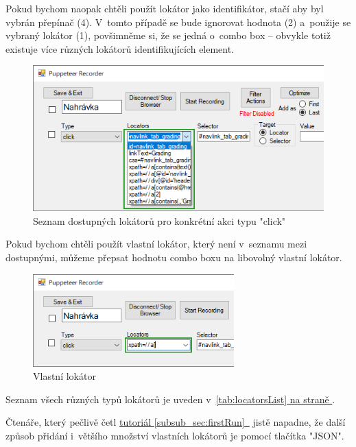 \documentclass[12pt, a4paper, twoside]{article}
\newcommand{\refFullAddedText}[3]{\hyperref[#1]{#2\ref{#1}~\nameref{#1}#3}}
\begin{document}
	Pokud bychom naopak chtěli použít lokátor jako identifikátor, stačí aby byl vybrán přepínač (4). V~tomto případě se bude ignorovat hodnota (2) a~použije se vybraný lokátor (1), povšimněme si, že se jedná o~combo box -- obvykle totiž existuje více různých lokátorů identifikujících element.
	\begin{figure}[H]
		\centering
		\includegraphics[width=1.0\textwidth]{allLocators.png}
		\caption{Seznam dostupných lokátorů pro konkrétní akci typu "click"}
	\end{figure}
	\newpage
	Pokud bychom chtěli použít vlastní lokátor, který není v~seznamu mezi dostupnými, můžeme přepsat hodnotu combo boxu na libovolný vlastní lokátor.
	\nopagebreak
	\begin{figure}[H]
		\centering
		\includegraphics[width=0.69\textwidth]{customLocator.png}
		\caption{Vlastní lokátor}
	\end{figure}
	Seznam všech různých typů lokátorů je uveden
v~\hyperref[tab:locatorsList]{\cref{tab:locatorsList} na straně \pageref{tab:locatorsList}}.
	
	Čtenáře, který pečlivě četl \refFullAddedText{subsub_sec:firstRun}{tutoriál }{} jistě napadne, že další způsob přidání i~většího množství vlastních lokátorů je pomocí tlačítka "JSON". 
	
\end{document}
